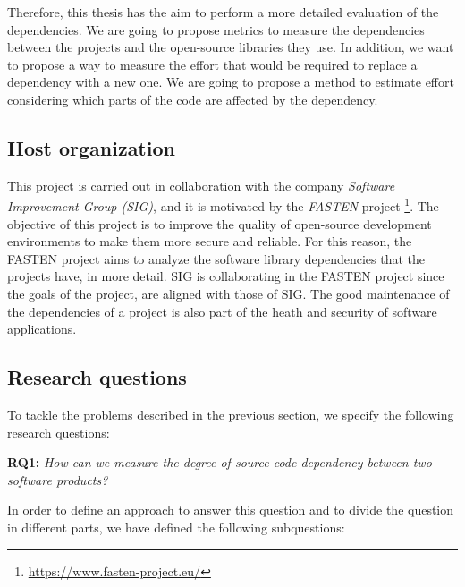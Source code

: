 \blankl
Therefore, this thesis has the aim to perform a more detailed evaluation of the dependencies. We are going to propose metrics to measure the dependencies between the projects and the open-source libraries they use. In addition, we want to propose a way to measure the effort that would be required to replace a dependency with a new one. We are going to propose a method to estimate effort considering which parts of the code are affected by the dependency.

\subsection{Host organization}
This project is carried out in collaboration with the company \textit{Software Improvement Group (SIG)}, and it is motivated by the \textit{FASTEN} project \footnote{\url{https://www.fasten-project.eu/}}. The objective of this project is to improve the quality of open-source development environments to make them more secure and reliable. For this reason, the FASTEN project aims to analyze the software library dependencies that the projects have, in more detail. SIG is collaborating in the FASTEN project since the goals of the project, are aligned with those of SIG. The good maintenance of the dependencies of a project is also part of the heath and security of software applications.

\subsection{Research questions} %
To tackle the problems described in the previous section, we specify the following research questions:

\blankl
\textbf{RQ1:} \textit{How can we measure the degree of source code dependency between two software products?}

In order to define an approach to answer this question and to divide the question in different parts, we have defined the following subquestions:


